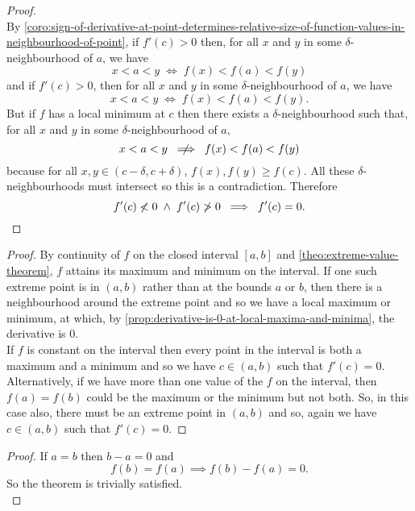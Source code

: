 \documentclass[../MathsNotesBase.tex]{subfiles}
\begin{document}
{\begin{proof}
			\bigskip
			\nl
			\\
			By \autoref{coro:sign-of-derivative-at-point-determines-relative-size-of-function-values-in-neighbourhood-of-point}, if ${ f'(c) > 0 }$ then, for all $x$ and $y$ in some $\delta$-neighbourhood of $a$, we have
			\[ x < a < y \; \iff \; f(x) < f(a) < f(y) \]
			and if ${ f'(c) > 0 }$, then for all $x$ and $y$ in some $\delta$-neighbourhood of $a$, we have
			\[ x < a < y \; \iff \; f(x) < f(a) < f(y). \]
			But if $f$ has a local minimum at $c$ then there exists a $\delta$-neighbourhood such that, for all $x$ and $y$ in some $\delta$-neighbourhood of $a$,
			\[ x < a < y \; \centernot\implies \; f(x) < f(a) < f(y) \]
			because for all ${ x,y \in (c - \delta, c + \delta) }$, ${ f(x),f(y) \geq f(c) }$. All these $\delta$-neighbourhoods must intersect so this is a contradiction.
			Therefore
			\[ f'(c) \centernot< 0 \; \land \; f'(c) \centernot> 0 \; \implies \; f'(c) = 0. \]
		\end{proof}
	
		\bigskip
		\begin{proof}
			By continuity of $f$ on the closed interval $[a,b]$ and \autoref{theo:extreme-value-theorem}, $f$ attains its maximum and minimum on the interval. If one such extreme point is in ${ (a,b) }$ rather than at the bounds $a$ or $b$, then there is a neighbourhood around the extreme point and so we have a local maximum or minimum, at which, by \autoref{prop:derivative-is-0-at-local-maxima-and-minima}, the derivative is 0.\\
			
			If $f$ is constant on the interval then every point in the interval is both a maximum and a minimum and so we have ${ c \in (a,b) }$ such that ${ f'(c) = 0 }$. Alternatively, if we have more than one value of the $f$ on the interval, then ${ f(a) = f(b) }$ could be the maximum or the minimum but not both. So, in this case also, there must be an extreme point in ${ (a,b) }$ and so, again we have ${ c \in (a,b) }$ such that ${ f'(c) = 0 }$.
		\end{proof}
	
		\bigskip
		\begin{proof}
			If ${ a = b }$ then ${ b - a = 0 }$ and 
			\[ f(b) = f(a) \implies f(b) - f(a) = 0. \]
			So the theorem is trivially satisfied.\\
			

\end{proof}}
\end{document}
